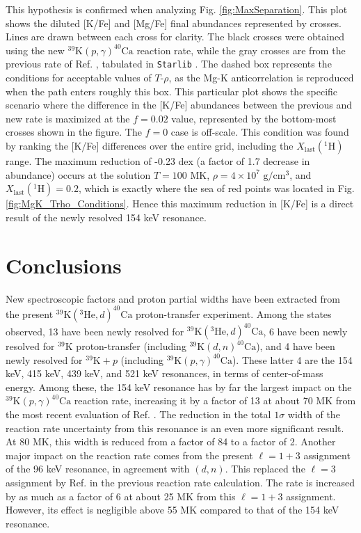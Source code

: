 This hypothesis is confirmed when analyzing Fig. \ref{fig:MaxSeparation}. This plot shows the diluted [K/Fe] and [Mg/Fe] final abundances represented by crosses. Lines are drawn between each cross for clarity. The black crosses were obtained using the new $^{39}\mathrm{K}(p,\gamma)^{40}\mathrm{Ca}$ reaction rate, while the gray crosses are from the previous rate of Ref. \cite{Longland2018}, tabulated in \texttt{Starlib} \cite{Sallaska2013}. The dashed box represents the conditions for acceptable values of $T$-$\rho$, as the Mg-K anticorrelation is reproduced when the path enters roughly this box. This particular plot shows the specific scenario where the difference in the [K/Fe] abundances between the previous and new rate is maximized at the $f=0.02$ value, represented by the bottom-most crosses shown in the figure. The $f=0$ case is off-scale. This condition was found by ranking the [K/Fe] differences over the entire grid, including the $X_{\mathrm{last}}(^{1}\mathrm{H})$ range. The maximum reduction of -0.23 dex (a factor of 1.7 decrease in abundance) occurs at the solution $T = 100$ MK, $\rho=4 \times 10^{7}$ $\mathrm{g}/\mathrm{cm}^{3}$, and $X_{\mathrm{last}}(^{1}\mathrm{H}) = 0.2$, which is exactly where the sea of red points was located in Fig. \ref{fig:MgK_Trho_Conditions}. Hence this maximum reduction in [K/Fe] is a direct result of the newly resolved 154 keV resonance.

\section{Conclusions}

New spectroscopic factors and proton partial widths have been extracted from the present $^{39}\mathrm{K}(^{3}\mathrm{He},d)^{40}\mathrm{Ca}$ proton-transfer experiment. Among the states observed, 13 have been newly resolved for $^{39}\mathrm{K}(^{3}\mathrm{He},d)^{40}\mathrm{Ca}$, 6 have been newly resolved for $^{39}\mathrm{K}$ proton-transfer (including $^{39}\mathrm{K}(d,n)^{40}\mathrm{Ca}$), and 4 have been newly resolved for $^{39}\mathrm{K}+p$ (including $^{39}\mathrm{K}(p, \gamma)^{40}\mathrm{Ca}$). These latter 4 are the 154 keV, 415 keV, 439 keV, and 521 keV resonances, in terms of center-of-mass energy. Among these, the 154 keV resonance has by far the largest impact on the $^{39}\mathrm{K}(p, \gamma)^{40}\mathrm{Ca}$ reaction rate, increasing it by a factor of 13 at about 70 MK from the most recent evaluation of Ref. \cite{Longland2018}. The reduction in the total $1\sigma$ width of the reaction rate uncertainty from this resonance is an even more significant result. At 80 MK, this width is reduced from a factor of 84 to a factor of 2. Another major impact on the reaction rate comes from the present $\ell=1+3$ assignment of the 96 keV resonance, in agreement with $(d,n)$. This replaced the $\ell=3$ assignment by Ref. \cite{Cage1971} in the previous reaction rate calculation. The rate is increased by as much as a factor of 6 at about 25 MK from this $\ell=1+3$ assignment. However, its effect is negligible above 55 MK compared to that of the 154 keV resonance.

